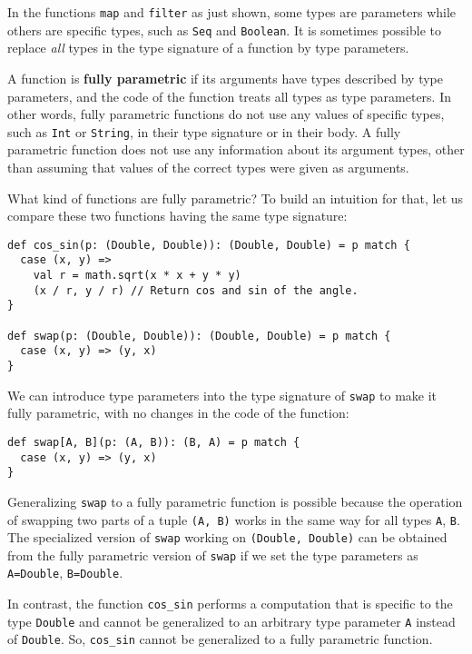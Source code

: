 In the functions \lstinline!map! and \lstinline!filter! as just
shown, some types are parameters while others are specific types,
such as \lstinline!Seq! and \lstinline!Boolean!. It is sometimes
possible to replace \emph{all} types in the type signature of a function
by type parameters.

A function is \textbf{fully parametric}
if its arguments have types described by type parameters, and the
code of the function treats all types as type parameters. In other
words, fully parametric functions do not use any values of specific
types, such as \lstinline!Int! or \lstinline!String!, in their type
signature or in their body. A fully parametric function does not use
any information about its argument types, other than assuming that
values of the correct types were given as arguments.

What kind of functions are fully parametric? To build an intuition
for that, let us compare these two functions having the same type
signature:
\begin{lstlisting}
def cos_sin(p: (Double, Double)): (Double, Double) = p match {
  case (x, y) =>
    val r = math.sqrt(x * x + y * y)
    (x / r, y / r) // Return cos and sin of the angle.
}

def swap(p: (Double, Double)): (Double, Double) = p match {
  case (x, y) => (y, x)
}
\end{lstlisting}
We can introduce type parameters into the type signature of \lstinline!swap!
to make it fully parametric, with no changes in the code of the function:
\begin{lstlisting}
def swap[A, B](p: (A, B)): (B, A) = p match {
  case (x, y) => (y, x)
}
\end{lstlisting}
Generalizing \lstinline!swap! to a fully parametric function is possible
because the operation of swapping two parts of a tuple \lstinline!(A, B)!
works in the same way for all types \lstinline!A!, \lstinline!B!.
The specialized version of \lstinline!swap! working on \lstinline!(Double, Double)!
can be obtained from the fully parametric version of \lstinline!swap!
if we set the type parameters as \lstinline!A=Double!, \lstinline!B=Double!.

In contrast, the function \lstinline!cos_sin! performs a computation
that is specific to the type \lstinline!Double! and cannot be generalized
to an arbitrary type parameter \lstinline!A! instead of \lstinline!Double!.
So, \lstinline!cos_sin! cannot be generalized to a fully parametric
function.

